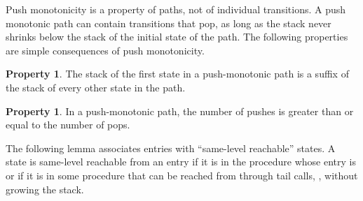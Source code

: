 \documentclass{LMCS}
\theoremstyle{definition} \newtheorem{property}[thm]{Property}
\begin{document}
\noindent
Push monotonicity is a property of paths, not of individual transitions.
A push monotonic path can contain transitions that pop, as long as the stack 
never shrinks below the stack of the initial state of the path.
The following properties are simple consequences of push monotonicity.
\begin{property}\label{prop:stack-suffix}
The stack of the first state in a push-monotonic path is a suffix of the stack
of every other state in the path.
\end{property}
\begin{property}
In a push-monotonic path, the number of pushes is greater than or equal to the
number of pops.
\end{property}

\noindent
The following lemma associates entries with ``same-level reachable'' states.
A state \astat{} is same-level reachable from an entry \entry{} if it is
in the procedure whose entry is \entry{} or if it is in some procedure
that can be reached from \entry{} through tail calls, \ie, without growing the
stack.
\end{document}
